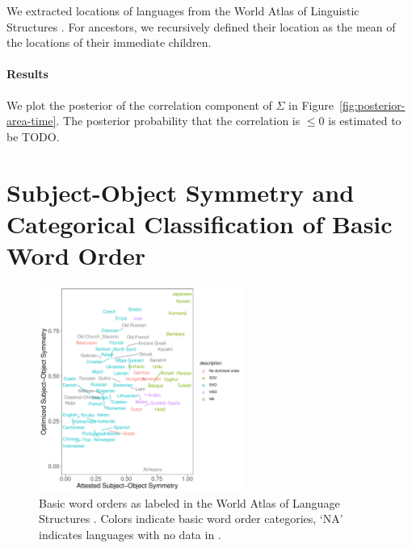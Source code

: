 \documentclass[11pt,a4paper]{article}
\begin{document}
We extracted locations of languages from the World Atlas of Linguistic Structures \citep{haspelmath2005the}.
For ancestors, we recursively defined their location as the mean of the locations of their immediate children.





\paragraph{Results}
We plot the posterior of the correlation component of $\Sigma$ in Figure~\ref{fig:posterior-area-time}.
The posterior probability that the correlation is $\leq 0$ is estimated to be TODO.







\section{Subject-Object Symmetry and Categorical Classification of Basic Word Order}


\begin{figure}
    \centering
    \includegraphics[width=0.6\textwidth]{../analysis/categorical_order/figures/by_categorical_order.pdf}
    \caption{Basic word orders as labeled in the World Atlas of Language Structures \citep{wals-81}. Colors indicate basic word order categories, `NA' indicates languages with no data in \citep{wals-81}.}
    \label{fig:categorical-basic-order}
\end{figure}
\end{document}
